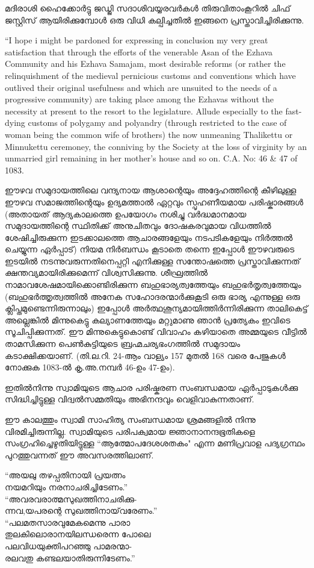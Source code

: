 \documentclass[12pt,openany]{book}
\newenvironment{myverse}
{\begin{quoting}[leftmargin=3em, rightmargin=3em, vskip=2ex, indentfirst=false, font=small]}
	{\end{quoting}}
\begin{document}
	മദിരാശി ഹൈക്കോർട്ടു ജഡ്ജി സദാശിവയ്യരവർകൾ തിരുവിതാംകൂറിൽ ചിഫ് ജസ്റ്റിസ് ആയിരിക്കുമ്പോൾ ഒരു വിധി കല്പിച്ചതിൽ ഇങ്ങനെ പ്രസ്താവിച്ചിരിക്കുന്നു.
	
	``I hope i might be pardoned for expressing in conclusion my very great satisfaction that through the efforts of the venerable Asan of the Ezhava Community and his Ezhava Samajam, most desirable reforms (or rather the relinquishment of the medieval pernicious customs and conventions which have outlived their original usefulness and which are unsuited to the needs of a progressive community) are taking place among the Ezhavas without the necessity at present to the resort to the legislature. Allude especially to the fast-dying customs of polygamy and polyandry (through restricted to the case of woman being the common wife of brothers) the now unmeaning Thalikettu or Minnukettu ceremoney, the conniving by the Society at the loss of virginity by an unmarried girl remaining in her mother's house and so on. C.A. No: 46 \& 47 of 1083.
	
	ഈഴവ സമുദായത്തിലെ വന്ദ്യനായ ആശാന്റെയും അദ്ദേഹത്തിന്റെ കീഴിലുള്ള ഈഴവ സമാജത്തിന്റെയും ഉദ്യമത്താൽ ഏറ്റവും സ്പൃഹണീയമായ പരിഷ്കാരങ്ങൾ (അതായത് ആദ്യകാലത്തെ ഉപയോഗം നശിച്ചു വർദ്ധമാനമായ സമുദായത്തിന്റെ സ്ഥിതിക്ക് അനുചിതവും ദോഷകരവുമായ വിധത്തിൽ ശേഷിച്ചിരുക്കുന്ന ഇടക്കാലത്തെ ആചാരങ്ങളേയും നടപടികളേയും നിർത്തൽ ചെയ്യുന്ന ഏർപ്പാട്) നിയമ നിർബന്ധം കൂടാതെ തന്നെ ഇപ്പോൾ ഈഴവരുടെ ഇടയിൽ നടന്നുവരുന്നതിനെപ്പറ്റി എനിക്കുള്ള സന്തോഷത്തെ പ്രസ്താവിക്കുന്നത് ക്ഷന്തവ്യമായിരിക്കുമെന്ന് വിശ്വസിക്കുന്നു. ശീഘ്രത്തിൽ നാമാവശേഷമായിക്കൊണ്ടിരിക്കുന്ന ബഹുഭാര്യത്വത്തേയും ബഹുഭർതൃത്വത്തേയും (ബഹുഭർത്തൃത്വത്തിൽ അനേക സഹോദരന്മാർക്കുകൂടി ഒരു ഭാര്യ എന്നുള്ള ഒരു ക്ലിപ്തമുണ്ടെന്നിരുന്നാലും) ഇപ്പോൾ അർത്ഥശൂന്യമായിത്തിർന്നിരിക്കുന്ന താലികെട്ട് അല്ലെങ്കിൽ മിന്നുകെട്ടു കല്യാണത്തേയും മറ്റുമാണു ഞാൻ പ്രത്യേകം ഇവിടെ സൂചിപ്പിക്കുന്നത്. ഈ മിന്നുകെട്ടുകൊണ്ട് വിവാഹം കഴിയാതെ അമ്മയുടെ വീട്ടിൽ താമസിക്കുന്ന പെൺകുട്ടിയുടെ ബ്രഹ്മചര്യഭംഗത്തിൽ സമുദായം കടാക്ഷിക്കയാണ്. (തി.ല.റി. 24-ആം വാള്യം 157 മുതൽ 168 വരെ പേജുകൾ നോക്കുക 1083-ൽ കൃ.അ.നമ്പർ 46-ഉം 47-ഉം).
	
	ഇതിൽനിന്നു സ്വാമിയുടെ ആചാര പരിഷ്കരണ സംബന്ധമായ ഏർപ്പാടുകൾക്കു സിദ്ധിച്ചിട്ടുള്ള വിദ്വൽസമ്മതിയും അഭിനന്ദവും വെളിവാകുന്നതാണ്.
	
	ഈ കാലത്തും സ്വാമി സാഹിത്യ സംബന്ധമായ ശ്രമങ്ങളിൽ നിന്നു വിരമിച്ചിരുന്നില്ല. സ്വാമിയുടെ പരിപക്വമായ ജ്ഞാനാനന്ദഭൂതികളെ സംഗ്രഹിച്ചെഴുതിയിട്ടുള്ള ``ആത്മോപദേശശതകം" എന്ന മണിപ്രവാള പദ്യഗ്രന്ഥം പുറത്തുവന്നത് ഈ അവസരത്തിലാണ്.
	
	\begin{myverse}
		``അയലു തഴപ്പതിനായി പ്രയത്നം \\
		നയമറിയും നരനാചരിച്ചിടേണം.''\\[1\baselineskip]
		``അവരവരാത്മസുഖത്തിനാചരിക്കു-\\
		ന്നവ,യപരന്റെ സുഖത്തിനായ്‌വരേണം.''\\[1\baselineskip]
		``പലമതസാരവുമേകമെന്നു പാരാ\\
		തുലകിലൊരാനയിലന്ധരെന്ന പോലെ\\
		പലവിധയുക്തിപറഞ്ഞു പാമരന്മാ-\\
		രലവതു കണ്ടലയാതിരുന്നിടേണം.''
	\end{myverse}
	
\end{document}
